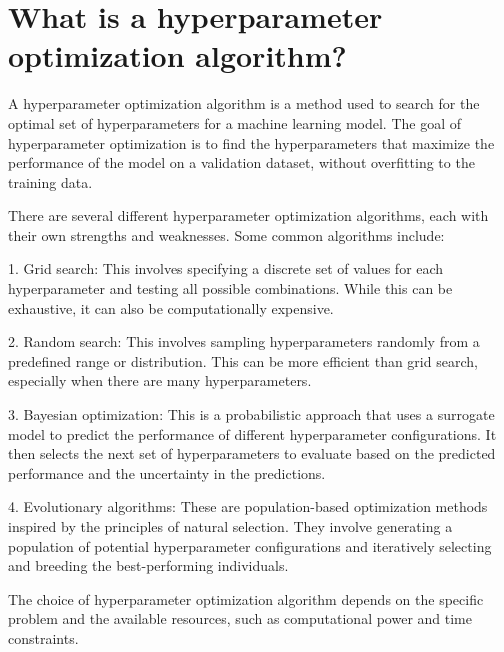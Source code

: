 \section{What is a hyperparameter optimization algorithm?}
A hyperparameter optimization algorithm is a method used to search for the optimal set of hyperparameters for a machine learning model. The goal of hyperparameter optimization is to find the hyperparameters that maximize the performance of the model on a validation dataset, without overfitting to the training data.

There are several different hyperparameter optimization algorithms, each with their own strengths and weaknesses. Some common algorithms include:

1. Grid search: This involves specifying a discrete set of values for each hyperparameter and testing all possible combinations. While this can be exhaustive, it can also be computationally expensive.

2. Random search: This involves sampling hyperparameters randomly from a predefined range or distribution. This can be more efficient than grid search, especially when there are many hyperparameters.

3. Bayesian optimization: This is a probabilistic approach that uses a surrogate model to predict the performance of different hyperparameter configurations. It then selects the next set of hyperparameters to evaluate based on the predicted performance and the uncertainty in the predictions.

4. Evolutionary algorithms: These are population-based optimization methods inspired by the principles of natural selection. They involve generating a population of potential hyperparameter configurations and iteratively selecting and breeding the best-performing individuals.

The choice of hyperparameter optimization algorithm depends on the specific problem and the available resources, such as computational power and time constraints.

